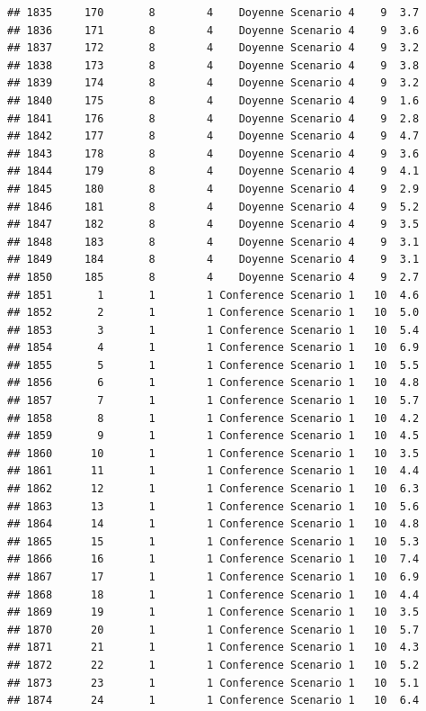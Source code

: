 \documentclass[
]{article}
\begin{document}
\begin{verbatim}
## 1835     170       8        4    Doyenne Scenario 4    9  3.7
## 1836     171       8        4    Doyenne Scenario 4    9  3.6
## 1837     172       8        4    Doyenne Scenario 4    9  3.2
## 1838     173       8        4    Doyenne Scenario 4    9  3.8
## 1839     174       8        4    Doyenne Scenario 4    9  3.2
## 1840     175       8        4    Doyenne Scenario 4    9  1.6
## 1841     176       8        4    Doyenne Scenario 4    9  2.8
## 1842     177       8        4    Doyenne Scenario 4    9  4.7
## 1843     178       8        4    Doyenne Scenario 4    9  3.6
## 1844     179       8        4    Doyenne Scenario 4    9  4.1
## 1845     180       8        4    Doyenne Scenario 4    9  2.9
## 1846     181       8        4    Doyenne Scenario 4    9  5.2
## 1847     182       8        4    Doyenne Scenario 4    9  3.5
## 1848     183       8        4    Doyenne Scenario 4    9  3.1
## 1849     184       8        4    Doyenne Scenario 4    9  3.1
## 1850     185       8        4    Doyenne Scenario 4    9  2.7
## 1851       1       1        1 Conference Scenario 1   10  4.6
## 1852       2       1        1 Conference Scenario 1   10  5.0
## 1853       3       1        1 Conference Scenario 1   10  5.4
## 1854       4       1        1 Conference Scenario 1   10  6.9
## 1855       5       1        1 Conference Scenario 1   10  5.5
## 1856       6       1        1 Conference Scenario 1   10  4.8
## 1857       7       1        1 Conference Scenario 1   10  5.7
## 1858       8       1        1 Conference Scenario 1   10  4.2
## 1859       9       1        1 Conference Scenario 1   10  4.5
## 1860      10       1        1 Conference Scenario 1   10  3.5
## 1861      11       1        1 Conference Scenario 1   10  4.4
## 1862      12       1        1 Conference Scenario 1   10  6.3
## 1863      13       1        1 Conference Scenario 1   10  5.6
## 1864      14       1        1 Conference Scenario 1   10  4.8
## 1865      15       1        1 Conference Scenario 1   10  5.3
## 1866      16       1        1 Conference Scenario 1   10  7.4
## 1867      17       1        1 Conference Scenario 1   10  6.9
## 1868      18       1        1 Conference Scenario 1   10  4.4
## 1869      19       1        1 Conference Scenario 1   10  3.5
## 1870      20       1        1 Conference Scenario 1   10  5.7
## 1871      21       1        1 Conference Scenario 1   10  4.3
## 1872      22       1        1 Conference Scenario 1   10  5.2
## 1873      23       1        1 Conference Scenario 1   10  5.1
## 1874      24       1        1 Conference Scenario 1   10  6.4

\end{verbatim}
\end{document}
